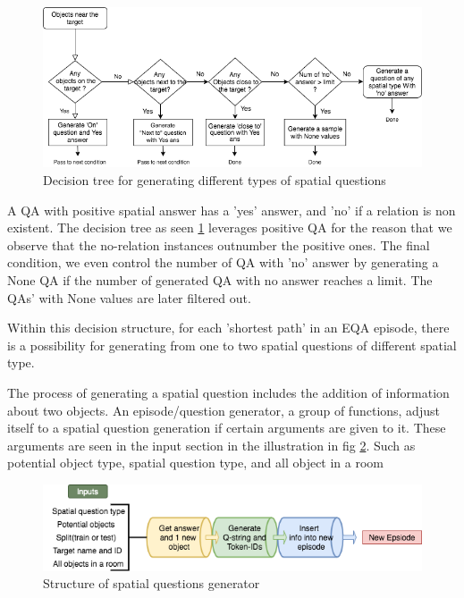 \begin{figure}[h]
\includegraphics[scale=0.4]{images/spatialconditions.png} %
\caption{Decision tree for generating different types of spatial questions}
\label{fig:spatial}
\end{figure}

A QA with positive spatial answer has a 'yes' answer, and 'no' if a relation is non existent. The decision tree as seen \ref{fig:spatial} leverages positive QA for the reason that we observe that the no-relation instances outnumber the positive ones. The final condition, we even control the number of QA with 'no' answer by generating a None QA if the number of generated QA with no answer reaches a limit. The QAs' with None values are later filtered out.

Within this decision structure, for each 'shortest path' in an EQA episode, there is a possibility for generating from one to two spatial questions of different spatial type. 

The process of generating a spatial question includes the addition of information about two objects. An episode/question generator, a group of functions, adjust itself to a spatial question generation if certain arguments are given to it. These arguments are seen in the input section  in the illustration in fig \ref{fig:spatialGen}. Such as potential  object type, spatial question type, and all object in a room 

\begin{figure}[h]
\includegraphics[scale=0.4]{images/spatialGenerator.png} %
\caption{Structure of spatial questions generator}
\label{fig:spatialGen}
\end{figure}

